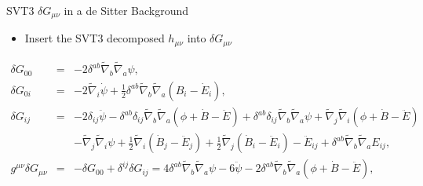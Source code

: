 \documentclass[8pt]{beamer}
\begin{document}
\begin{frame}{SVT3 $\delta G_{\mu\nu}$ in a de Sitter Background}
	\begin{itemize}
		\item Insert the SVT3 decomposed $h_{\mu\nu}$ into $\delta G_{\mu\nu}$
	\end{itemize}
	\begin{eqnarray*}
	\delta G_{00}&=&- 2 \delta^{ab} \tilde{\nabla}_{b}\tilde{\nabla}_{a}\psi,
	\nonumber\\
	\delta G_{0i}&=&- 2 \tilde{\nabla}_{i}\dot{\psi}+ \tfrac{1}{2} \delta^{ab} \tilde{\nabla}_{b}\tilde{\nabla}_{a}(B_{i} -  \dot{E}_{i}),
	\nonumber\\
	\delta G_{ij}&=&- 2 \delta_{ij} \ddot{\psi} -  \delta^{ab} \delta_{ij} \tilde{\nabla}_{b}\tilde{\nabla}_{a}(\phi+\dot{B}  -\ddot{E})+ \delta^{ab} \delta_{ij} \tilde{\nabla}_{b}\tilde{\nabla}_{a}\psi 
	+ \tilde{\nabla}_{j}\tilde{\nabla}_{i}(\phi+\dot{B} -  \ddot{E}) 
	\nonumber\\
	&&-  \tilde{\nabla}_{j}\tilde{\nabla}_{i}\psi
	+ \tfrac{1}{2} \tilde{\nabla}_{i}(\dot{B}_{j} - \ddot{E}_{j}) + \tfrac{1}{2} \tilde{\nabla}_{j}(\dot{B}_{i}  
	- \ddot{E}_{i})- \ddot{E}_{ij} + \delta^{ab} \tilde{\nabla}_{b}\tilde{\nabla}_{a}E_{ij},
	\nonumber\\
	g^{\mu\nu}\delta G_{\mu\nu}&=&-\delta G_{00}+\delta^{ij}\delta G_{ij}=4 \delta^{ab} \tilde{\nabla}_{b}\tilde{\nabla}_{a}\psi -6\ddot{\psi}-2 \delta^{ab} \tilde{\nabla}_{b}\tilde{\nabla}_{a}(\phi+\dot{B}  -\ddot{E}),
	\label{2.3}
	\end{eqnarray*}
\end{frame}

\end{document}
